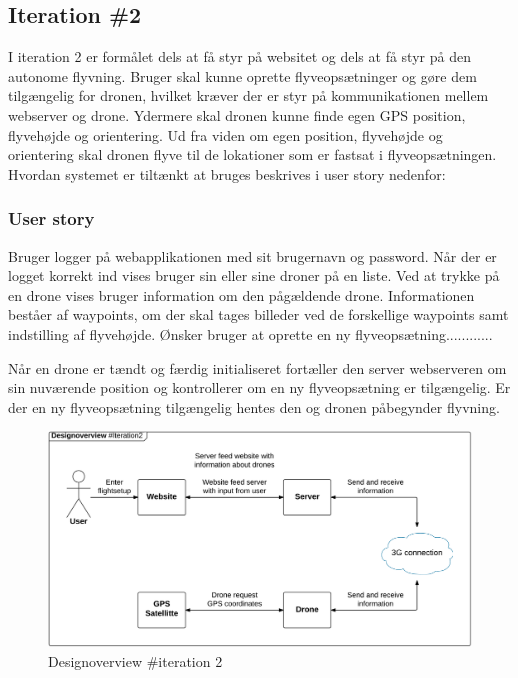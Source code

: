\subsection{Iteration \#2}
I iteration 2 er formålet dels at få styr på websitet og dels at få styr på den autonome flyvning. Bruger skal kunne oprette flyveopsætninger og gøre dem tilgængelig for dronen, hvilket kræver der er styr på kommunikationen mellem webserver og drone. Ydermere skal dronen kunne finde egen GPS position, flyvehøjde og orientering. Ud fra viden om egen position, flyvehøjde og orientering skal dronen flyve til de lokationer som er fastsat i flyveopsætningen. 
Hvordan systemet er tiltænkt at bruges beskrives i user story nedenfor:

\subsubsection*{User story}
Bruger logger på webapplikationen med sit brugernavn og password. Når der er logget korrekt ind vises bruger sin eller sine droner på en liste. Ved at trykke på en drone vises bruger information om den pågældende drone. Informationen beståer af waypoints, om der skal tages billeder ved de forskellige waypoints samt indstilling af flyvehøjde. Ønsker bruger at oprette en ny flyveopsætning............

Når en drone er tændt og færdig initialiseret fortæller den server webserveren om sin nuværende position og kontrollerer om en ny flyveopsætning er tilgængelig. Er der en ny flyveopsætning tilgængelig hentes den og dronen påbegynder flyvning.

\begin{figure}[H]
	\centering
	\includegraphics[width=1\textwidth]{Billeder/design_overview/design_overview_iteration2.png}
	\vspace{-.5cm}
	\caption{Designoverview \#iteration 2}
	\label{fig:design_overview_UC1}
\end{figure}




